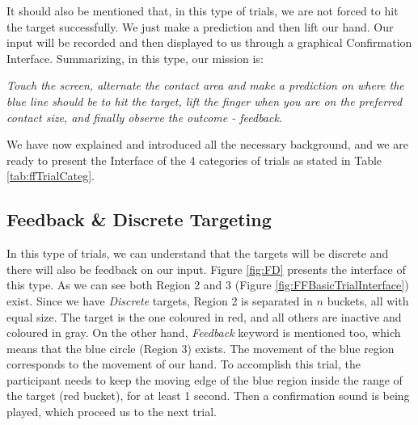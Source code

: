 \begin{itemize}
	It should also be mentioned that, in this type of trials, we are not forced to hit the target successfully. We just make a prediction and then lift our hand. Our input will be recorded and then displayed to us through a graphical Confirmation Interface.  Summarizing, in this type, our mission is:

	\emph{Touch the screen, alternate the contact area and make a prediction on where the blue line should be to hit the target, lift the finger when you are on the preferred contact size, and finally observe the outcome - feedback}.
\end{itemize}

We have now explained and introduced all the necessary background, and we are ready to present the Interface of the 4 categories of trials as stated in Table \ref{tab:ffTrialCateg}.


\subsection{Feedback \& Discrete Targeting}


In this type of trials, we can understand that the targets will be discrete and there will also be feedback on our input. Figure \ref{fig:FD} presents the interface of this type. As we can see both Region 2 and 3 (Figure \ref{fig:FFBasicTrialInterface}) exist. Since we have \emph{Discrete} targets, Region 2 is separated in $n$ buckets, all with equal size. The target is the one coloured in red, and all others are inactive and coloured in gray. On the other hand, \emph{Feedback} keyword is mentioned too, which means that the blue circle (Region 3) exists. The movement of the blue region corresponds to the movement of our hand. To accomplish this trial, the participant needs to keep the moving edge of the blue region inside the range of the target (red bucket), for at least 1 second. Then a confirmation sound is being played, which proceed us to the next trial.

